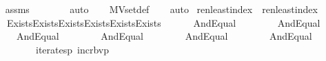 \begin{isabellebody}
\ \ \isamarkupfalse%
\ assms\ \isanewline
\ \ \ \ \ \isamarkupfalse%
\ auto{\isacharbrackleft}{\kern0pt}{}{\isacharbrackright}{\kern0pt}\isanewline
\ \ \isamarkupfalse%
\ MVset{\isacharunderscore}{\kern0pt}def\isanewline
\ \ \isamarkupfalse%
\ auto%
\endisatagproof
{\isafoldproof}%
%
\isadelimproof
\isanewline
%
\endisadelimproof
\isanewline
{}\isamarkupfalse%
\ ren{\isacharunderscore}{\kern0pt}least{\isacharunderscore}{\kern0pt}index\ \ {\isachardoublequoteopen}ren{\isacharunderscore}{\kern0pt}least{\isacharunderscore}{\kern0pt}index{\isacharparenleft}{\kern0pt}{\isasymphi}{\isacharparenright}{\kern0pt}\ {\isasymequiv}\isanewline
\ \ \ \ Exists{\isacharparenleft}{\kern0pt}Exists{\isacharparenleft}{\kern0pt}Exists{\isacharparenleft}{\kern0pt}Exists{\isacharparenleft}{\kern0pt}Exists{\isacharparenleft}{\kern0pt}Exists{\isacharparenleft}{\kern0pt}\isanewline
\ \ \ \ \ \ And{\isacharparenleft}{\kern0pt}Equal{\isacharparenleft}{\kern0pt}{}{\isacharcomma}{\kern0pt}\ {}{}{\isacharparenright}{\kern0pt}{\isacharcomma}{\kern0pt}\ \isanewline
\ \ \ \ \ \ And{\isacharparenleft}{\kern0pt}Equal{\isacharparenleft}{\kern0pt}{}{\isacharcomma}{\kern0pt}\ {}{}{\isacharparenright}{\kern0pt}{\isacharcomma}{\kern0pt}\ \isanewline
\ \ \ \ \ \ And{\isacharparenleft}{\kern0pt}Equal{\isacharparenleft}{\kern0pt}{}{\isacharcomma}{\kern0pt}\ {}{}{\isacharhash}{\kern0pt}{\isacharplus}{\kern0pt}{}{\isacharparenright}{\kern0pt}{\isacharcomma}{\kern0pt}\ \isanewline
\ \ \ \ \ \ And{\isacharparenleft}{\kern0pt}Equal{\isacharparenleft}{\kern0pt}{}{\isacharcomma}{\kern0pt}\ {}{}{\isacharhash}{\kern0pt}{\isacharplus}{\kern0pt}{}{\isacharparenright}{\kern0pt}{\isacharcomma}{\kern0pt}\ \isanewline
\ \ \ \ \ \ And{\isacharparenleft}{\kern0pt}Equal{\isacharparenleft}{\kern0pt}{}{\isacharcomma}{\kern0pt}\ {}{}{\isacharhash}{\kern0pt}{\isacharplus}{\kern0pt}{}{\isacharparenright}{\kern0pt}{\isacharcomma}{\kern0pt}\ \isanewline
\ \ \ \ \ \ And{\isacharparenleft}{\kern0pt}Equal{\isacharparenleft}{\kern0pt}{}{\isacharcomma}{\kern0pt}\ {}{}{\isacharparenright}{\kern0pt}{\isacharcomma}{\kern0pt}\ \isanewline
\ \ \ \ \ \ \ \ \ \ iterates{\isacharparenleft}{\kern0pt}{\isasymlambda}p{\isachardot}{\kern0pt}\ incr{\isacharunderscore}{\kern0pt}bv{\isacharparenleft}{\kern0pt}p{\isacharparenright}{\kern0pt}{\isacharbackquote}{\kern0pt}{}{\isacharcomma}{\kern0pt}\ {}{}{\isacharcomma}{\kern0pt}\ {\isasymphi}{\isacharparenright}{\kern0pt}{\isacharparenright}{\kern0pt}{\isacharparenright}{\kern0pt}{\isacharparenright}{\kern0pt}{\isacharparenright}{\kern0pt}{\isacharparenright}{\kern0pt}{\isacharparenright}{\kern0pt}{\isacharparenright}{\kern0pt}{\isacharparenright}{\kern0pt}{\isacharparenright}{\kern0pt}{\isacharparenright}{\kern0pt}{\isacharparenright}{\kern0pt}{\isacharparenright}{\kern0pt}{\isachardoublequoteclose}\ \isanewline

\end{isabellebody}
